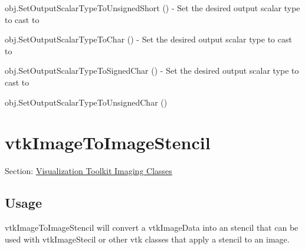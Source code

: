 \begin{DoxyItemize}
\item {\ttfamily obj.\-Set\-Output\-Scalar\-Type\-To\-Unsigned\-Short ()} -\/ Set the desired output scalar type to cast to  
\item {\ttfamily obj.\-Set\-Output\-Scalar\-Type\-To\-Char ()} -\/ Set the desired output scalar type to cast to  
\item {\ttfamily obj.\-Set\-Output\-Scalar\-Type\-To\-Signed\-Char ()} -\/ Set the desired output scalar type to cast to  
\item {\ttfamily obj.\-Set\-Output\-Scalar\-Type\-To\-Unsigned\-Char ()}  
\end{DoxyItemize}\hypertarget{vtkimaging_vtkimagetoimagestencil}{}\section{vtk\-Image\-To\-Image\-Stencil}\label{vtkimaging_vtkimagetoimagestencil}
Section\-: \hyperlink{sec_vtkimaging}{Visualization Toolkit Imaging Classes} \hypertarget{vtkwidgets_vtkxyplotwidget_Usage}{}\subsection{Usage}\label{vtkwidgets_vtkxyplotwidget_Usage}
vtk\-Image\-To\-Image\-Stencil will convert a vtk\-Image\-Data into an stencil that can be used with vtk\-Image\-Stecil or other vtk classes that apply a stencil to an image.

